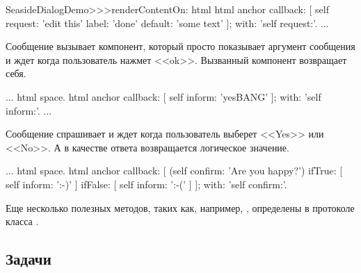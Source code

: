 \documentclass[a4paper,10pt,twoside]{book}
\begin{document}
\begin{code}{}
SeasideDialogDemo>>>renderContentOn: html
	html anchor
		callback: [ self request: 'edit this' label: 'done' default: 'some text' ];
		with: 'self request:'.
...
\end{code}


Сообщение  вызывает компонент,
который просто показывает аргумент сообщения и ждет когда пользователь
нажмет <<ok>>.
Вызванный компонент возвращает себя.

\begin{code}{}
...
	html space.
	html anchor
		callback: [ self inform: 'yesBANG' ];
		with: 'self inform:'.
...
\end{code}


Сообщение  спрашивает и ждет когда
пользователь выберет <<Yes>> или <<No>>.
А в качестве ответа возвращается логическое значение.

\begin{code}{}
...
	html space.
	html anchor
		callback: [
			(self confirm: 'Are you happy?')
				ifTrue: [ self inform: ':-)' ]
				ifFalse: [ self inform: ':-(' ]
			];
		with: 'self confirm:'.
\end{code}


Еще несколько полезных методов, таких как, например,
,
определены в протоколе 
класса .


\subsection{Задачи}
\end{document}
